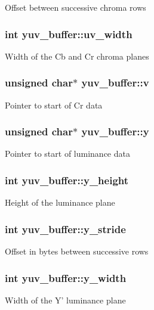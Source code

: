 Offset between successive chroma rows \hypertarget{structyuv__buffer_a8c59a57c35af0be519ee47f15e49fe2b}{
\subsubsection[{uv\+\_\+width}]{\setlength{\rightskip}{0pt plus 5cm}int yuv\+\_\+buffer\+::uv\+\_\+width}}\label{structyuv__buffer_a8c59a57c35af0be519ee47f15e49fe2b}
Width of the Cb and Cr chroma planes \hypertarget{structyuv__buffer_aa429491dd112adb0254672c59ef55075}{
\subsubsection[{v}]{\setlength{\rightskip}{0pt plus 5cm}unsigned char$\ast$ yuv\+\_\+buffer\+::v}}\label{structyuv__buffer_aa429491dd112adb0254672c59ef55075}
Pointer to start of Cr data \hypertarget{structyuv__buffer_a725727c70eeced6b8c90866973399ac1}{
\subsubsection[{y}]{\setlength{\rightskip}{0pt plus 5cm}unsigned char$\ast$ yuv\+\_\+buffer\+::y}}\label{structyuv__buffer_a725727c70eeced6b8c90866973399ac1}
Pointer to start of luminance data \hypertarget{structyuv__buffer_a5a8b60e012247e2caffcbbaca99414e0}{
\subsubsection[{y\+\_\+height}]{\setlength{\rightskip}{0pt plus 5cm}int yuv\+\_\+buffer\+::y\+\_\+height}}\label{structyuv__buffer_a5a8b60e012247e2caffcbbaca99414e0}
Height of the luminance plane \hypertarget{structyuv__buffer_a9cdf61834c11b2351640a4a243ad0549}{
\subsubsection[{y\+\_\+stride}]{\setlength{\rightskip}{0pt plus 5cm}int yuv\+\_\+buffer\+::y\+\_\+stride}}\label{structyuv__buffer_a9cdf61834c11b2351640a4a243ad0549}
Offset in bytes between successive rows \hypertarget{structyuv__buffer_aaa6c06c071da933231647238418d5fc0}{
\subsubsection[{y\+\_\+width}]{\setlength{\rightskip}{0pt plus 5cm}int yuv\+\_\+buffer\+::y\+\_\+width}}\label{structyuv__buffer_aaa6c06c071da933231647238418d5fc0}
Width of the Y' luminance plane 

